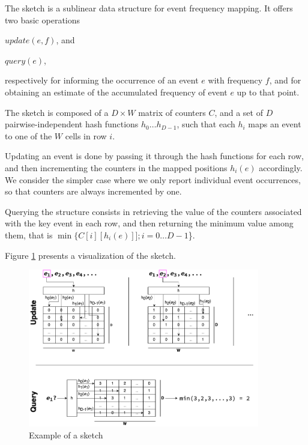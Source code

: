 The \cm sketch \cite{Cormode2005} is a sublinear data structure for event frequency mapping.
It offers two basic operations
\begin{compactenum}
\item $update(e, f)$, and
\item $query(e)$,
\end{compactenum}
respectively for informing the occurrence of an event $e$ with frequency $f$, and for obtaining an estimate of the accumulated frequency of event $e$ up to that point.

The sketch is composed of a $D\times W$ matrix of counters $C$, and a set of $D$ pairwise-independent hash functions $h_0\ldots h_{D-1}$, such that each $h_i$ maps an event to one of the $W$ cells in row $i$.


Updating an event is done by passing it through the hash functions for each row, and then incrementing the counters in
the mapped positions $h_i(e)$ accordingly. 
We consider the simpler case where we only report individual event occurrences, so that counters are always incremented by one.

Querying the structure consists in retrieving the value of the counters associated with the key event in each row,  and then returning
the minimum value among them, that is $\min\{C[i][h_i(e)]]; i=0\ldots D-1$\}.


Figure \ref{fig:countminexample} presents a visualization of the \cm sketch.

\begin{figure}[htbp]
	\begin{center}
    \includegraphics[width=0.9\textwidth]{figures/cm-example}
	\end{center}
	\caption{Example of a \cm sketch}\label{fig:countminexample}
\end{figure}

